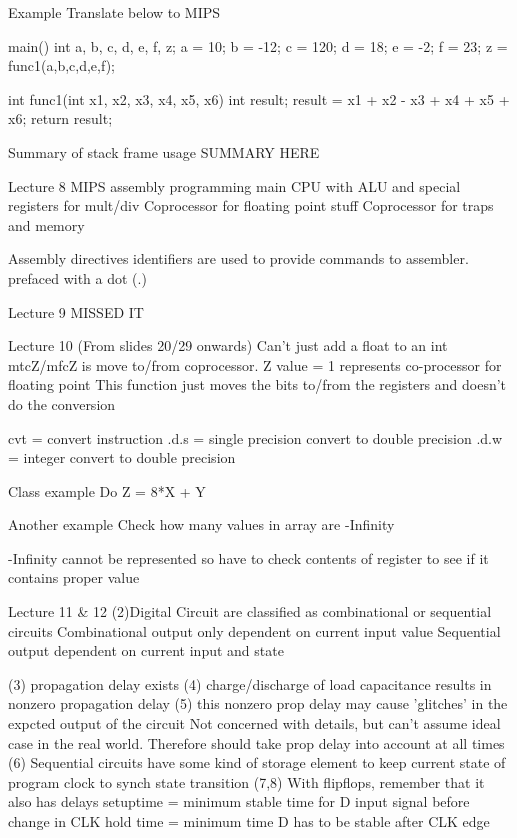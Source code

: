 \documentclass{article}
\begin{document}
	Example
		Translate below to MIPS

		main(){
			int a, b, c, d, e, f, z;
			a = 10; b = -12; c = 120; d = 18; e = -2; f = 23;
			z = func1(a,b,c,d,e,f);
		}

		int func1(int x1, x2, x3, x4, x5, x6){
			int result;
			result = x1 + x2 - x3 + x4 + x5 + x6;
			return result;
		}

	Summary of stack frame usage
		SUMMARY HERE

Lecture 8
	MIPS assembly programming
		main CPU with ALU and special registers for mult/div
		Coprocessor for floating point stuff
		Coprocessor for traps and memory

		Assembly directives
			identifiers are used to provide commands to assembler.
			prefaced with a dot (.)

Lecture 9
	MISSED IT

Lecture 10 (From slides 20/29 onwards)
	Can't just add a float to an int
	mtcZ/mfcZ is move to/from coprocessor. Z value = 1 represents co-processor for floating point
		This function just moves the bits to/from the registers and doesn't do the conversion

	cvt = convert instruction
	.d.s = single precision convert to double precision
	.d.w = integer convert to double precision

	Class example
		Do Z = 8*X + Y

	Another example
		Check how many values in array are -Infinity

		-Infinity cannot be represented so have to check contents of register to see if it contains proper value

Lecture 11 \& 12
	(2)Digital Circuit are classified as combinational or sequential circuits
		Combinational	output only dependent on current input value
		Sequential 	output dependent on current input and state

	(3) propagation delay exists
	(4) charge/discharge of load capacitance results in nonzero propagation delay
	(5) this nonzero prop delay may cause 'glitches' in the expcted output of the circuit
		Not concerned with details, but can't assume ideal case in the real world. Therefore should take prop delay into account at all times
	(6) Sequential circuits
		have some kind of storage element to keep current state of program
		clock to synch state transition
	(7,8) With flipflops, remember that it also has delays
		setuptime = minimum stable time for D input signal before change in CLK
		hold time = minimum time D has to be stable after CLK edge
\end{document}
